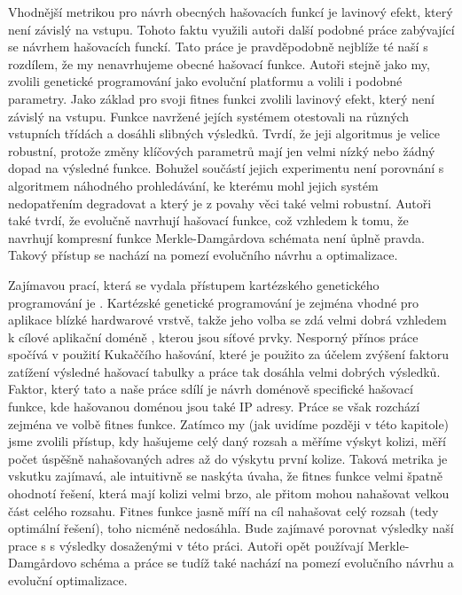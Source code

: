 Vhodnější metrikou pro návrh obecných hašovacích funkcí je lavinový efekt, který 
není závislý na vstupu. Tohoto faktu využili autoři další podobné práce \cite{NCHF_auto_design}
zabývající se návrhem hašovacích funckí. Tato práce je pravděpodobně nejblíže té 
naší s rozdílem, že my nenavrhujeme obecné hašovací funkce. Autoři stejně jako my,
zvolili genetické programování jako evoluční platformu a volili i podobné parametry.
Jako základ pro svoji fitnes funkci zvolili lavinový efekt, který není
závislý na vstupu. Funkce navržené jejích systémem otestovali na různých vstupních třídách
a dosáhli slibných výsledků. Tvrdí, že jeji algoritmus je velice robustní, protože změny
klíčových parametrů mají jen velmi nízký nebo žádný dopad na výsledné funkce. Bohužel
součástí jejich experimentu není porovnání s algoritmem náhodného prohledávání, ke 
kterému mohl jejich systém nedopatřením degradovat a který je z povahy věci také 
velmi robustní. Autoři také tvrdí, že evolučně navrhují hašovací funkce, což 
vzhledem k tomu, že navrhují kompresní funkce Merkle-Damg\r{a}rdova schémata
není ůplně pravda. Takový přístup se nachází na pomezí evolučního návrhu a optimalizace.

Zajímavou prací, která se vydala přístupem kartézského genetického programování je
\cite{dobai0}. Kartézské genetické programování je zejména vhodné pro aplikace blízké
hardwarové vrstvě, takže jeho volba se zdá velmi dobrá vzhledem k cílové aplikační doméně
, kterou jsou síťové prvky. Nesporný přínos práce spočívá v použití Kukaččího hašování, které
je použito za účelem zvýšení faktoru zatížení výsledné hašovací tabulky a práce tak dosáhla velmi
dobrých výsledků. Faktor, který tato a naše práce sdílí je návrh doménově specifické hašovací 
funkce, kde hašovanou doménou jsou také IP adresy. Práce se však rozchází zejména ve volbě 
fitnes funkce. Zatímco my (jak uvidíme později v této kapitole) jsme zvolili přístup, kdy hašujeme
celý daný rozsah a měříme výskyt kolizi, měří počet úspěšně nahašovaných adres až do výskytu
první kolize. Taková metrika je vskutku zajímavá, ale intuitivně se naskýta úvaha, že fitnes funkce
velmi špatně ohodnotí řešení, která mají kolizi velmi brzo, ale přitom mohou nahašovat velkou část
celého rozsahu. Fitnes funkce jasně míří na cíl nahašovat celý rozsah (tedy optimální řešení), toho
nicméně nedosáhla. Bude zajímavé porovnat výsledky naší prace s s výsledky dosaženými v této
práci. Autoři opět používají Merkle-Damg\r{a}rdovo schéma a práce se tudíž také nachází na 
pomezí evolučního návrhu a evoluční optimalizace.

